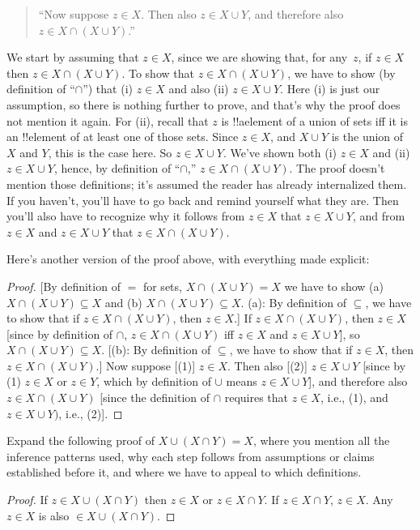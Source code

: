 \documentclass[../../../include/open-logic-section]{subfiles}
\begin{document}
\begin{quote}
``Now suppose $z \in X$. Then also $z \in X \cup Y$, and
therefore also $z \in X \cap (X \cup Y)$.''
\end{quote}

We start by assuming that $z \in X$, since we are showing that, for
any~$z$, if $z \in X$ then $z \in X \cap (X \cup Y)$.  To show that $z
\in X \cap (X \cup Y)$, we have to show (by definition of ``$\cap$'')
that (i) $z \in X$ and also (ii) $z \in X \cup Y$. Here (i) is just
our assumption, so there is nothing further to prove, and that's why
the proof does not mention it again. For (ii), recall that $z$ is
!!a{element} of a union of sets iff it is an !!{element} of at least
one of those sets. Since $z \in X$, and $X \cup Y$ is the union of $X$
and $Y$, this is the case here. So $z \in X \cup Y$. We've shown both
(i) $z \in X$ and (ii) $z \in X \cup Y$, hence, by definition of
``$\cap$,'' $z \in X \cap (X \cup Y)$.  The proof doesn't mention
those definitions; it's assumed the reader has already internalized
them.  If you haven't, you'll have to go back and remind yourself what
they are. Then you'll also have to recognize why it follows from $z
\in X$ that $z \in X \cup Y$, and from $z \in X$ and $z \in X \cup Y$
that $z \in X \cap (X \cup Y)$.

Here's another version of the proof above, with everything made
explicit:
\begin{proof}{}
[By definition of $=$ for sets, $X \cap (X \cup Y) = X$ we have to
  show (a) $X \cap (X \cup Y) \subseteq X$ and (b) $X \cap (X \cup Y)
  \subseteq X$. (a): By definition of $\subseteq$, we have to show
  that if $z \in X \cap (X \cup Y)$, then $z \in X$.]  If $z \in X
\cap (X \cup Y)$, then $z \in X$ [since by definition of $\cap$, $z
  \in X \cap (X \cup Y)$ iff $z \in X$ and $z \in X \cup Y$], so $X
\cap (X \cup Y) \subseteq X$. [(b): By definition of $\subseteq$, we
  have to show that if $z \in X$, then $z \in X \cap (X \cup Y)$.] Now
suppose [(1)] $z \in X$. Then also [(2)] $z \in X \cup Y$ [since by
  (1) $z \in X$ or $z \in Y$, which by definition of $\cup$ means $z
  \in X \cup Y$], and therefore also $z \in X \cap (X \cup Y)$ [since
  the definition of $\cap$ requires that $z \in X$, i.e., (1), and $z
  \in X \cup Y)$, i.e., (2)].
\end{proof}

\begin{prob}
Expand the following proof of $X \cup (X \cap Y) = X$, where you
mention all the inference patterns used, why each step follows from
assumptions or claims established before it, and where we have to
appeal to which definitions.
\begin{proof}
  If $z \in X \cup (X \cap Y)$ then $z \in X$ or $z \in X \cap Y$. If
  $z \in X \cap Y$, $z \in X$. Any $z \in X$ is also $\in X \cup (X
  \cap Y)$.
\end{proof}
\end{prob}
\end{document}
